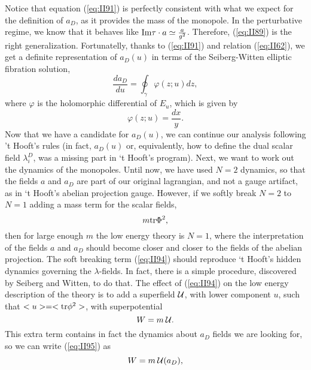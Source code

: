 Notice that equation (\ref{eq:II91}) is perfectly consistent with
what we expect for the definition of $a_D$, as it provides the mass
of the monopole. In the perturbative regime, we know that it behaves
like $\hbox {Im} \tau \cdot a \simeq \frac {a}{g^2}$. Therefore,
(\ref{eq:II89}) is the right generalization. Fortunatelly, thanks
to (\ref{eq:II91}) and relation (\ref{eq:II62}), we get a
definite representation of $a_D(u)$ in terms of the
Seiberg-Witten elliptic fibration solution,
\begin{equation}
\frac {da_D}{du} = \oint_{\gamma} \varphi(z;u)dz,
\label{eq:II92}
\end{equation}
where $\varphi$ is the holomorphic differential of $E_u$, which
is given by
\begin{equation}
\varphi(z;u) = \frac {dx}{y}.
\label{eq:II93}
\end{equation}
Now that we have a candidate for $a_D(u)$, we can continue our
analysis following 't Hooft's rules (in fact, $a_D(u)$ or,
equivalently, how to define the dual scalar field $\lambda_i^D$,
was a missing part in `t Hooft's program). Next, we want to work
out the dynamics of the monopoles. Until now, we have used
$N\!=\!2$ dynamics, so that the fields $a$ and $a_D$ are part of
our original lagrangian, and not a gauge artifact, as in `t
Hooft's abelian projection gauge. However, if we softly break
$N\!=\!2$ to $N\!=\!1$ \cite{SW} adding a mass term for the scalar fields,
\begin{equation}
m \hbox{tr}\Phi^2,
\label{eq:II94}
\end{equation}
then for large enough $m$ the low energy theory is $N\!=\!1$,
where the interpretation of the fields $a$ and $a_D$ should
become closer and closer to the fields of the
abelian projection. The soft breaking term (\ref{eq:II94}) should
reproduce `t Hooft's hidden dynamics governing the
$\lambda$-fields. In fact, there is a simple procedure, discovered
by Seiberg and Witten, to do that. The effect of (\ref{eq:II94})
on the low energy description of the theory is to add a
superfield ${\cal U}$, with lower component $u$, such that
$<u>=<\hbox {tr} \phi^2>$, with superpotential
\begin{equation}
W=m \: {\cal U}.
\label{eq:II95}
\end{equation}
This extra term contains in fact the dynamics about $a_D$ fields
we are looking for, so we can write (\ref{eq:II95}) as
\begin{equation}
W=m \: {\cal U}(a_D),
\label{eq:II96}
\end{equation}
